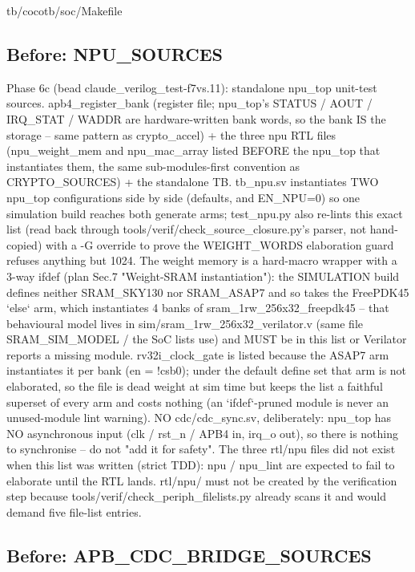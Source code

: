 \begin{relocated}{tb/cocotb/soc/Makefile}
\subsection*{Before: NPU\_SOURCES}

\begin{textblock}
Phase 6c (bead claude_verilog_test-f7vs.11): standalone npu_top unit-test sources.
apb4_register_bank (register file; npu_top's STATUS / AOUT / IRQ_STAT / WADDR are hardware-written
bank words, so the bank IS the storage -- same pattern as crypto_accel) + the three npu RTL files
(npu_weight_mem and npu_mac_array listed BEFORE the npu_top that instantiates them, the same
sub-modules-first convention as CRYPTO_SOURCES) + the standalone TB. tb_npu.sv instantiates TWO
npu_top configurations side by side (defaults, and EN_NPU=0) so one simulation build reaches both
generate arms; test_npu.py also re-lints this exact list (read back through
tools/verif/check_source_closure.py's parser, not hand-copied) with a -G override to prove the
WEIGHT_WORDS elaboration guard refuses anything but 1024.
The weight memory is a hard-macro wrapper with a 3-way ifdef (plan Sec.7 "Weight-SRAM
instantiation"): the SIMULATION build defines neither SRAM_SKY130 nor SRAM_ASAP7 and so takes the
FreePDK45 `else` arm, which instantiates 4 banks of sram_1rw_256x32_freepdk45 -- that behavioural
model lives in sim/sram_1rw_256x32_verilator.v (same file SRAM_SIM_MODEL / the SoC lists use) and
MUST be in this list or Verilator reports a missing module. rv32i_clock_gate is listed because the
ASAP7 arm instantiates it per bank (en = !csb0); under the default define set that arm is not
elaborated, so the file is dead weight at sim time but keeps the list a faithful superset of every
arm and costs nothing (an `ifdef`-pruned module is never an unused-module lint warning).
NO cdc/cdc_sync.sv, deliberately: npu_top has NO asynchronous input (clk / rst_n / APB4 in,
irq_o out), so there is nothing to synchronise -- do not "add it for safety". The three rtl/npu
files did not exist when this list was written (strict TDD): npu / npu_lint are expected to fail
to elaborate until the RTL lands. rtl/npu/ must not be created by the verification step because
tools/verif/check_periph_filelists.py already scans it and would demand five file-list entries.
\end{textblock}

\subsection*{Before: APB\_CDC\_BRIDGE\_SOURCES}


\end{relocated}
